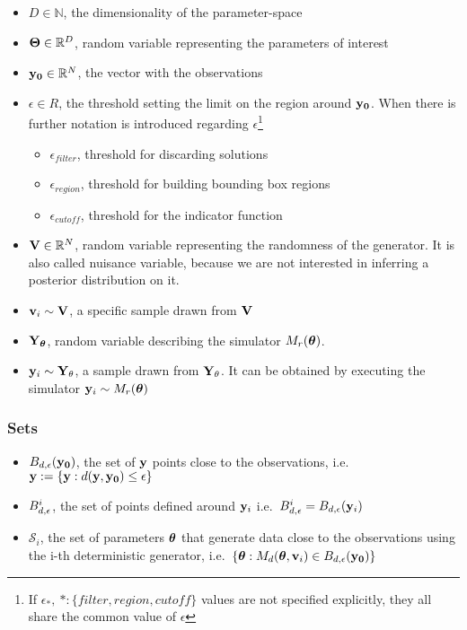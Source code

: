 \begin{itemize}
\item $D \in \mathbb{N}$, the dimensionality of the parameter-space
\item $\mathbf{\Theta} \in \mathbb{R}^D$, random variable representing the parameters of interest
\item $\mathbf{y_0} \in \mathbb{R}^N$, the vector with the observations
\item $\epsilon \in R$, the threshold setting the limit on the region
  around $\mathbf{y_0}$. When there is further notation is introduced
  regarding $\epsilon$\footnote{If
    $\epsilon_*, \: *:\{filter, region, cutoff\}$ values are not specified
    explicitly, they all share the common value of $\epsilon$}
  \begin{itemize}
  \item $\epsilon_{filter}$, threshold for discarding solutions
  \item $\epsilon_{region}$, threshold for building bounding box regions
  \item $\epsilon_{cutoff}$, threshold for the indicator function
  \end{itemize}
  
\item $\mathbf{V} \in \mathbb{R}^N$, random variable representing the randomness of
  the generator. It is also called nuisance variable, because we are
  not interested in inferring a posterior distribution on it.
\item $\mathbf{v}_i \sim \mathbf{V}$, a specific sample drawn from $\mathbf{V}$
\item $\mathbf{Y}_{\boldsymbol{\theta}}$, random variable describing the simulator $M_r(\boldsymbol{\theta})$. 
\item $\mathbf{y}_i \sim \mathbf{Y}_\theta$, a sample drawn from $\mathbf{Y}_\theta$. It can
  be obtained by executing the simulator $\mathbf{y}_i \sim M_r(\boldsymbol{\theta})$
\end{itemize}


\subsubsection*{Sets}
\label{sec:sets}

\begin{itemize}
\item $B_{d,\epsilon}(\mathbf{y_0})$, the set of $\mathbf{y}$ points close to the
  observations, i.e.\ $\mathbf{y} := \{\mathbf{y}: d(\mathbf{y}, \mathbf{y_0}) \leq \epsilon \}$
\item $B_{d,\epsilon}^i$, the set of points defined around $\mathbf{y}_i$ i.e.\
  $B_{d,\epsilon}^i = B_{d,\epsilon}(\mathbf{y}_i)$
\item $\mathcal{S}_i$, the set of parameters $\boldsymbol{\theta}$ that generate data close
  to the observations using the i-th deterministic generator, i.e.\
  $\{ \boldsymbol{\theta}: M_d(\boldsymbol{\theta}, \mathbf{v}_i) \in B_{d,\epsilon}(\mathbf{y_0}) \}$
\end{itemize}
    
